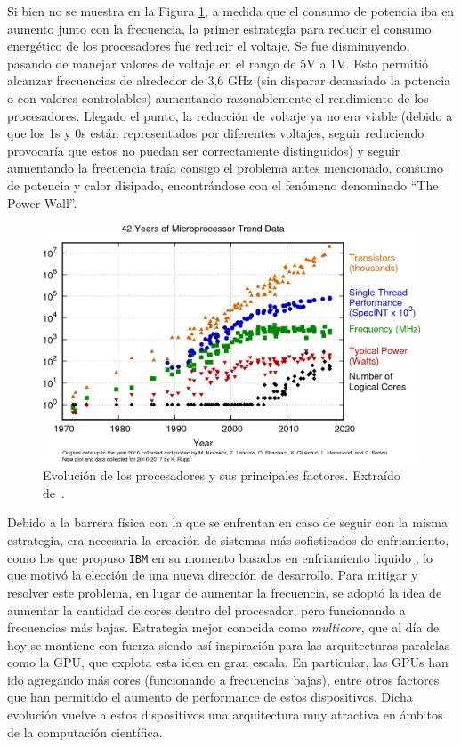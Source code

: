 Si bien no se muestra en la Figura \ref{fig:42-trend-data}, a medida que el consumo de potencia iba en aumento junto con la frecuencia, la primer estrategia para reducir el consumo energético de los procesadores fue reducir el voltaje. Se fue disminuyendo, pasando de manejar valores de voltaje en el rango de 5V a 1V. Esto permitió alcanzar frecuencias de alrededor de 3,6 GHz (sin disparar demasiado la potencia o con valores controlables) aumentando razonablemente el rendimiento de los procesadores. Llegado el punto, la reducción de voltaje ya no era viable (debido  a que los 1s y 0s están representados por diferentes voltajes, seguir reduciendo provocaría que estos no puedan ser correctamente distinguidos) y seguir aumentando la frecuencia traía consigo el problema antes mencionado, consumo de potencia y calor disipado, encontrándose con el fenómeno denominado ``The Power Wall''.
\begin{figure}
    \centering
    \includegraphics[width=\textwidth]{imagenes/chapter2/42-years-processor-trend.png}
    \caption{Evolución de los procesadores y sus principales factores. Extraído de~\cite{42-trend-data}.}
    \label{fig:42-trend-data}
\end{figure}

Debido a la barrera física con la que se enfrentan en caso de seguir con la misma estrategia, era necesaria la creación de sistemas más sofisticados de enfriamiento, como los que propuso \texttt{IBM} en su momento basados en enfriamiento liquido \cite{ibm-cooling}, lo que motivó la elección de una nueva dirección de desarrollo. Para mitigar y resolver este problema, en lugar de aumentar la frecuencia, se adoptó la idea de aumentar la cantidad de cores dentro del procesador, pero funcionando a frecuencias más bajas. Estrategia mejor conocida como \textit{multicore}, que al día de hoy se mantiene con fuerza siendo así inspiración para las arquitecturas paralelas como la GPU, que explota esta idea en gran escala. En particular, las GPUs han ido agregando más cores (funcionando a frecuencias bajas), entre otros factores que han permitido el aumento de performance de estos dispositivos. Dicha evolución vuelve a estos dispositivos una arquitectura muy atractiva en ámbitos de la computación científica.

